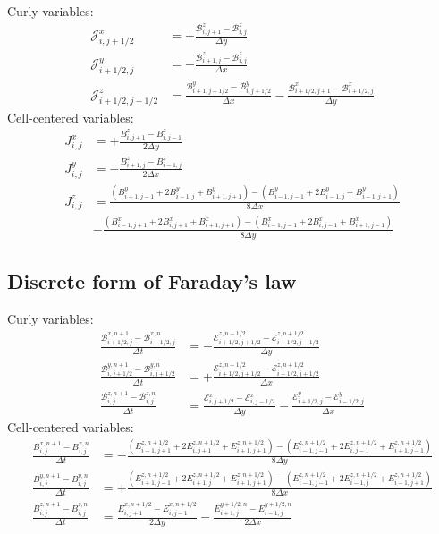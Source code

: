 \documentclass{article}
\begin{document}
Curly variables:
\begin{align}
  \mathcal{J}^x_{i,j+1/2} &=
  +\frac{\mathcal{B}^z_{i,j+1} - \mathcal{B}^z_{i,j}}{\Delta y} \\
  \mathcal{J}^y_{i+1/2,j} &=
  -\frac{\mathcal{B}^z_{i+1,j} - \mathcal{B}^z_{i,j}}{\Delta x} \\
  \mathcal{J}^z_{i+1/2,j+1/2} &=
  \frac{\mathcal{B}^y_{i+1,j+1/2} - \mathcal{B}^y_{i,j+1/2}}{\Delta x} -
  \frac{\mathcal{B}^x_{i+1/2,j+1} - \mathcal{B}^x_{i+1/2,j}}{\Delta y}
\end{align}
Cell-centered variables:
\begin{align}
  J^x_{i,j} &= +\frac{B^z_{i,j+1} - B^z_{i,j-1}}{2\Delta y} \\
  J^y_{i,j} &= -\frac{B^z_{i+1,j} - B^z_{i-1,j}}{2\Delta x} \\
  J^z_{i,j} &=
  \frac{(B^y_{i+1,j-1} + 2 B^y_{i+1,j} + B^y_{i+1,j+1})
      - (B^y_{i-1,j-1} + 2 B^y_{i-1,j} + B^y_{i-1,j+1})}{8\Delta x}
      \nonumber\\ &-
  \frac{(B^x_{i-1,j+1} + 2 B^x_{i,j+1} + B^x_{i+1,j+1})
      - (B^x_{i-1,j-1} + 2 B^x_{i,j-1} + B^x_{i+1,j-1})}{8\Delta y}
\end{align}

\subsection{Discrete form of Faraday's law}
Curly variables:
\begin{align}
  \frac{\mathcal{B}^{x,n+1}_{i+1/2,j}
      - \mathcal{B}^{x,n  }_{i+1/2,j}}{\Delta t} &= -
  \frac{\mathcal{E}^{z,n+1/2}_{i+1/2,j+1/2}
      - \mathcal{E}^{z,n+1/2}_{i+1/2,j-1/2}}{\Delta y} \\
  \frac{\mathcal{B}^{y,n+1}_{i,j+1/2}
      - \mathcal{B}^{y,n  }_{i,j+1/2}}{\Delta t} &= +
  \frac{\mathcal{E}^{z,n+1/2}_{i+1/2,j+1/2}
      - \mathcal{E}^{z,n+1/2}_{i-1/2,j+1/2}}{\Delta x} \\
  \frac{\mathcal{B}^{z,n+1}_{i,j}
      - \mathcal{B}^{z,n  }_{i,j}}{\Delta t} &=
  \frac{\mathcal{E}^x_{i,j+1/2} - \mathcal{E}^x_{i,j-1/2}}{\Delta y} -
  \frac{\mathcal{E}^y_{i+1/2,j} - \mathcal{E}^y_{i-1/2,j}}{\Delta x}
\end{align}
Cell-centered variables:
\begin{align}
  \frac{B^{x,n+1}_{i,j} - B^{x,n}_{i,j}}{\Delta t} &=
  -\frac{
    (E^{z,n+1/2}_{i-1,j+1} + 2 E^{z,n+1/2}_{i,j+1} + E^{z,n+1/2}_{i+1,j+1}) -
    (E^{z,n+1/2}_{i-1,j-1} + 2 E^{z,n+1/2}_{i,j-1} + E^{z,n+1/2}_{i+1,j-1})}
    {8\Delta y} \\
  \frac{B^{y,n+1}_{i,j} - B^{y,n}_{i,j}}{\Delta t} &=
  +\frac{
    (E^{z,n+1/2}_{i+1,j-1} + 2 E^{z,n+1/2}_{i+1,j} + E^{z,n+1/2}_{i+1,j+1}) -
    (E^{z,n+1/2}_{i-1,j-1} + 2 E^{z,n+1/2}_{i-1,j} + E^{z,n+1/2}_{i-1,j+1})}
    {8\Delta x} \\
  \frac{B^{z,n+1}_{i,j} - B^{z,n}_{i,j}}{\Delta t} &=
  \frac{E^{x,n+1/2}_{i,j+1} - E^{x,n+1/2}_{i,j-1}}{2\Delta y} -
  \frac{E^{y+1/2,n}_{i+1,j} - E^{y+1/2,n}_{i-1,j}}{2\Delta x}
\end{align}
\end{document}
